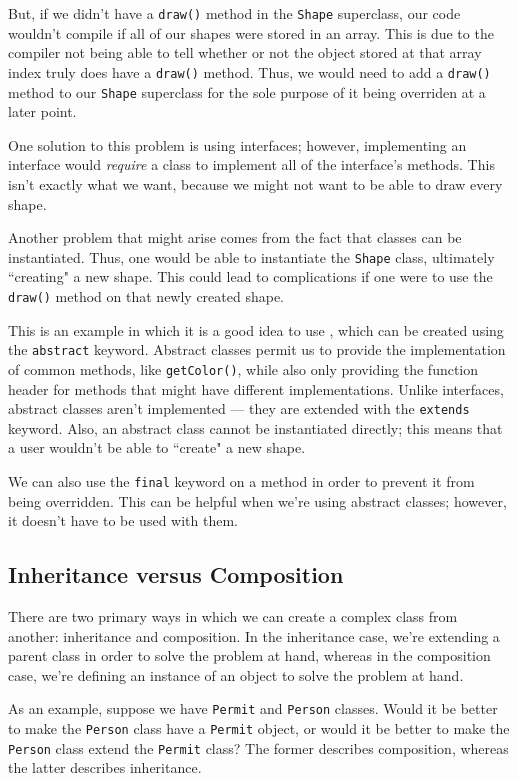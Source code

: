 But, if we didn't have a \verb!draw()! method in the \verb!Shape! superclass, our code wouldn't compile if all of our shapes were stored in an array. This is due to the compiler not being able to tell whether or not the object stored at that array index truly does have a \verb!draw()! method. Thus, we would need to add a \verb!draw()! method to our \verb!Shape! superclass for the sole purpose of it being overriden at a later point.

One solution to this problem is using interfaces; however, implementing an interface would \textit{require} a class to implement all of the interface's methods. This isn't exactly what we want, because we might not want to be able to draw every shape. 

Another problem that might arise comes from the fact that classes can be instantiated. Thus, one would be able to instantiate the \verb!Shape! class, ultimately ``creating" a new shape. This could lead to complications if one were to use the \verb!draw()! method on that newly created shape.

This is an example in which it is a good idea to use , which can be created using the \verb!abstract! keyword. Abstract classes permit us to provide the implementation of common methods, like \verb!getColor()!, while also only providing the function header for methods that might have different implementations. Unlike interfaces, abstract classes aren't implemented --- they are extended with the \verb!extends! keyword. Also, an abstract class cannot be instantiated directly; this means that a user wouldn't be able to ``create" a new shape. 

We can also use the \verb!final! keyword on a method in order to prevent it from being overridden. This can be helpful when we're using abstract classes; however, it doesn't have to be used with them.


\subsection{Inheritance versus Composition}

There are two primary ways in which we can create a complex class from another: inheritance and composition. In the inheritance case, we're extending a parent class in order to solve the problem at hand, whereas in the composition case, we're defining an instance of an object to solve the problem at hand.

As an example, suppose we have \verb!Permit! and \verb!Person! classes. Would it be better to make the \verb!Person! class have a \verb!Permit! object, or would it be better to make the \verb!Person! class extend the \verb!Permit! class? The former describes composition, whereas the latter describes inheritance. 

